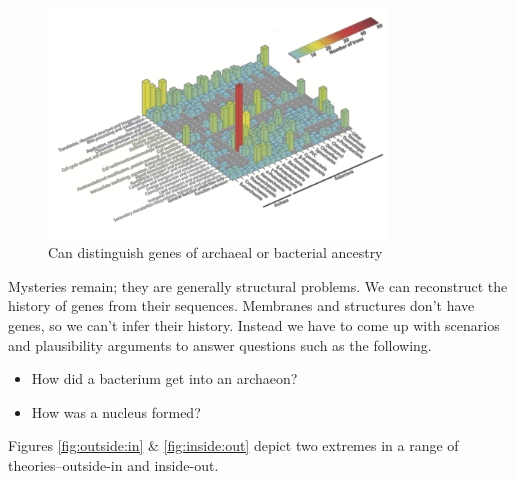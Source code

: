 \documentclass[]{article}
\begin{document}
\begin{figure}[H]
	\caption[We can distinguish genes of archaeal or bacterial ancestry]{Can distinguish genes of archaeal or bacterial ancestry\cite{thiergart2012evolutionary}}
	\label{fig:distinguish:genes:archaeal:bacterial}
	\includegraphics[width=0.8\textwidth]{thiergart2012}
\end{figure}

Mysteries remain; they are generally structural problems. We can reconstruct the history of genes from their sequences. Membranes and structures don't have genes, so we can't infer their history. Instead we have to come up with scenarios and plausibility arguments to answer questions such as the following. 

\begin{itemize}
	\item How did a bacterium get into an archaeon? 
	\item How was a nucleus formed?
\end{itemize}

Figures \ref{fig:outside:in} \& \ref{fig:inside:out} depict  two extremes in a range of theories--outside-in and inside-out.
\end{document}
